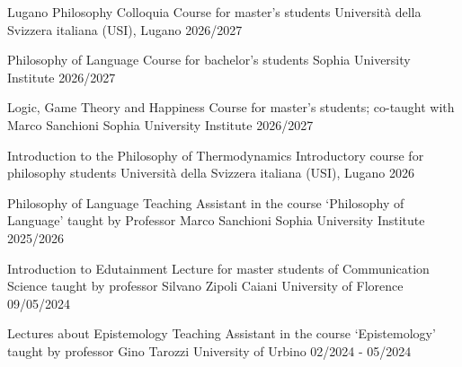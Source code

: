 \newpage
{}



\begin{cvhonors}

 \cvhonor
   {Lugano Philosophy Colloquia} %
 {Course for master's students} %
  {Università della Svizzera italiana (USI), Lugano} %
  {2026/2027} %


 \cvhonor
   {Philosophy of Language} %
 {Course for bachelor's students} %
  {Sophia University Institute} %
  {2026/2027} %


 \cvhonor
   {Logic, Game Theory and Happiness} %
 {Course for master's students; co-taught with Marco Sanchioni} %
  {Sophia University Institute} %
  {2026/2027} %


 \cvhonor
   {Introduction to the Philosophy of Thermodynamics} %
 {Introductory course for philosophy students} %
  {Università della Svizzera italiana (USI), Lugano} %
  {2026} %


 \cvhonor
   {Philosophy of Language} %
 {Teaching Assistant in the course ‘Philosophy of Language’ taught by Professor Marco Sanchioni} %
  {Sophia University Institute} %
  {2025/2026} %

 \cvhonor
   {Introduction to Edutainment } %
 {Lecture for master students of Communication Science taught by professor Silvano Zipoli Caiani} %
  {University of Florence} %
  {09/05/2024} %


 \cvhonor
   {Lectures about Epistemology} %
 {Teaching Assistant in the course ‘Epistemology’ taught by professor Gino Tarozzi} %
  {University of Urbino} %
  {02/2024 - 05/2024} %



\end{cvhonors}
